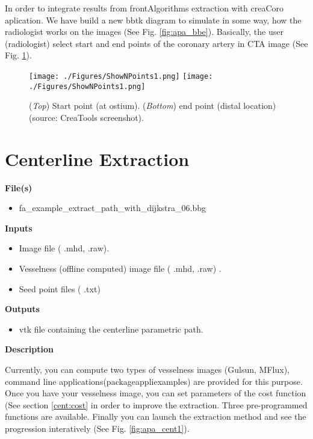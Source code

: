 In order to integrate results from frontAlgorithms extraction with creaCoro aplication. We have build a new bbtk diagram to simulate in some way, how the radiologist works on the images (See Fig. \ref{fig:apa_bbe}). Basically, the user (radiologist) select start and end points of the coronary artery in CTA image (See Fig. \ref{fig:apa_sp1}). 

\begin{figure}[ht]
	\centering
		\texttt{[image: ./Figures/ShowNPoints1.png]}
		\texttt{[image: ./Figures/ShowNPoints1.png]}
	\caption[Radiologist's GUI]{(\textit{Top}) Start point (at ostium). (\textit{Bottom}) end point (distal location) (source: CreaTools screenshot).}
	\label{fig:apa_sp1}
\end{figure}

\section{Centerline Extraction}

\textbf{File(s)}
\begin{itemize}
\item fa\_example\_extract\_path\_with\_dijkstra\_06.bbg
\end{itemize}

\textbf{Inputs}
\begin{itemize}
\item Image file (\* .mhd, \* .raw).
\item Vesselness (offline computed) image file (\* .mhd, \* .raw) .
\item Seed point files (\* .txt)
\end{itemize}

\textbf{Outputs}
\begin{itemize}
\item vtk file containing the centerline parametric path.
\end{itemize}

\textbf{Description}

Currently, you can compute two types of vesselness images (Gulsun, MFlux), command line applications(package\/appli\/examples) are provided for this purpose. Once you have your vesselness image, you can set parameters of the cost function (See section \ref{cent:cost} in order to improve the extraction. Three pre-programmed functions are available. Finally you can launch the extraction method and see the progression interatively (See Fig. \ref{fig:apa_cent1}).

